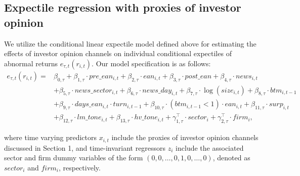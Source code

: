 \documentclass[11pt]{article}
\begin{document}
\hypertarget{er-with-proxies-of-investor-opinion}{%
\subsection{Expectile regression with proxies of investor opinion}\label{er-with-proxies-of-investor-opinion}}

We utilize the conditional linear expectile model defined above for estimating the effects of investor opinion channels on individual conditional expectiles of abnormal returns \(e_{\tau,t}(r_{i,t})\). Our model specification is as follows:
\vspace{-0.5cm}
\begin{align}
e_{\tau,t}(r_{i,t}) = &\beta_{0,\tau}+\beta_{1,\tau}\cdot pre\_ean_{i,t} + \beta_{2,\tau}\cdot ean_{i,t} + \beta_{3,\tau}\cdot post\_ean + \beta_{4,\tau}\cdot news_{i,t} \nonumber\\
&+\beta_{5,\tau}\cdot news\_sector_{i,t} + \beta_{6,\tau}\cdot news\_day_{i,t}  + \beta_{7,\tau}\cdot \log(size_{i,t}) + \beta_{8,\tau} \cdot btm_{i,t-1} \nonumber\\
&+ \beta_{9,\tau}\cdot days\_ean_{i,t}\cdot turn_{i,t-1}+ \beta_{10,\tau}\cdot (btm_{i,t-1}<1)\cdot ean_{i,t} +  \beta_{11,\tau}\cdot surp_{i,t}\nonumber\\
& + \beta_{12,\tau}\cdot lm\_tone_{i,t} + \beta_{13,\tau}\cdot hv\_tone_{i,t} + \gamma_{1,\tau}^{\top}\cdot sector_{i}+ \gamma_{2,\tau}^\top\cdot firm_{i},\label{eq:mod0}
\end{align}

where time varying predictors $x_{i,t}$ include the proxies of investor opinion channels discussed in Section 1, and time-invariant regressors $z_i$ include the associated sector and firm dummy variables of the form \((0,0,\ldots,0,1,0,\ldots,0)\), denoted as \(sector_{i}\) and \(firm_{i}\), respectively.
\end{document}
